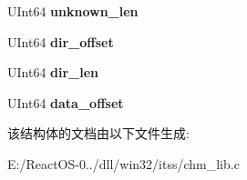\begin{DoxyCompactItemize}
\item 
\mbox{\label{structchm_itsf_header_a226ed4addf1256eabee4f35706009fc7}} 
U\+Int64 {\bfseries unknown\+\_\+len}
\item 
\mbox{\label{structchm_itsf_header_adc398a048dd491c0a07b7ab6eb70ec26}} 
U\+Int64 {\bfseries dir\+\_\+offset}
\item 
\mbox{\label{structchm_itsf_header_ac1909e4dbd12dc1cfbf3230fc3c50e9c}} 
U\+Int64 {\bfseries dir\+\_\+len}
\item 
\mbox{\label{structchm_itsf_header_a611185495452515e632b6cff4699d350}} 
U\+Int64 {\bfseries data\+\_\+offset}
\end{DoxyCompactItemize}


该结构体的文档由以下文件生成\+:\begin{DoxyCompactItemize}
\item 
E\+:/\+React\+O\+S-\/0../dll/win32/itss/chm\+\_\+lib.\+c\end{DoxyCompactItemize}
